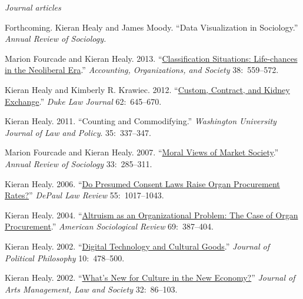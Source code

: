 \documentclass[11pt,article,oneside]{memoir}
\begin{document}
\vspace{-0.075in}

\normalsize

\bigskip
\noindent\emph{Journal articles \vspace{0.05in}}
 

\ind Forthcoming. Kieran Healy and James Moody. ``Data Visualization in Sociology.'' \emph{Annual Review of Sociology.}

\ind Marion Fourcade and Kieran Healy. 2013. ``\href{http://kieranhealy.org/files/papers/classification-situations.pdf}{Classification Situations: Life-chances in the Neoliberal Era}.'' \emph{Accounting, Organizations, and Society} 38:~559--572.

\ind Kieran Healy and Kimberly R. Krawiec. 2012. ``\href{http://kieranhealy.org/files/papers/custom-contract-kidney.pdf}{Custom, Contract, and Kidney Exchange}.'' \emph{Duke Law Journal} 62:~645--670. 

\ind Kieran Healy. 2011. ``Counting and Commodifying.'' \emph{Washington University Journal of Law and Policy}. 35:~337--347.

\ind Marion Fourcade and Kieran Healy. 2007. ``\href{http://arjournals.annualreviews.org/doi/pdf/10.1146/annurev.soc.33.040406.131642}{Moral Views of Market Society}.'' \emph{Annual Review of Sociology} 33:~285--311. 

\ind Kieran Healy. 2006. ``\href{http://www.kieranhealy.org/files/papers/presumed-consent.pdf}{Do Presumed Consent Laws Raise Organ Procurement Rates?}'' \emph{DePaul Law Review} 55:~1017--1043. 

\ind Kieran Healy. 2004. ``\href{http://www.kieranhealy.org/files/papers/asr2004.pdf}{Altruism as an Organizational Problem: The Case of Organ Procurement}.''
 \emph{American Sociological Review} 69:~387--404.

\ind Kieran Healy. 2002. ``\href{http://www.kieranhealy.org/files/papers/jpp.pdf}{Digital Technology and Cultural Goods}.'' \emph{Journal of
  Political Philosophy} 10:~478--500. 

\ind Kieran Healy. 2002. ``\href{http://www.kieranhealy.org/files/papers/culture-newecon.pdf}{What's New for Culture in the New Economy?}'' \emph{Journal
  of Arts Management, Law and Society} 32:~86--103. 
\end{document}
